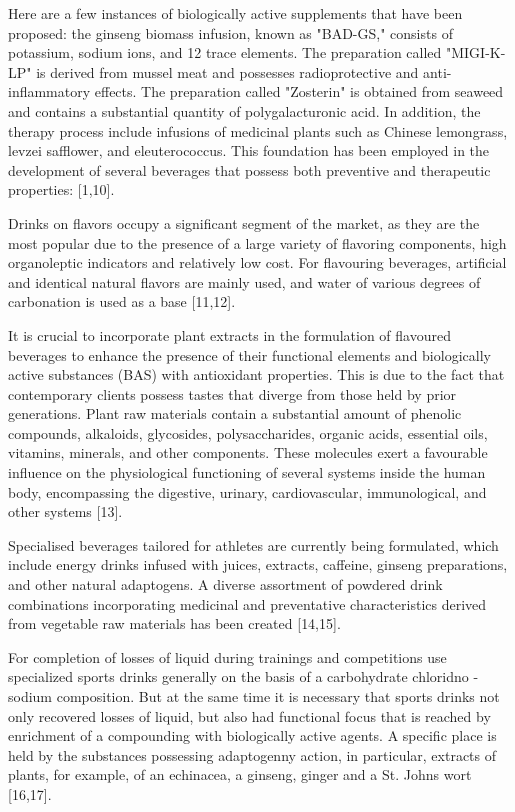 \begin{multicols}{2}
Here are a few instances of biologically active supplements that have
been proposed: the ginseng biomass infusion, known as "BAD-GS," consists
of potassium, sodium ions, and 12 trace elements. The preparation called
"MIGI-K-LP" is derived from mussel meat and possesses radioprotective
and anti-inflammatory effects. The preparation called "Zosterin" is
obtained from seaweed and contains a substantial quantity of
polygalacturonic acid. In addition, the therapy process include
infusions of medicinal plants such as Chinese lemongrass, levzei
safflower, and eleuterococcus. This foundation has been employed in the
development of several beverages that possess both preventive and
therapeutic properties: {[}1,10{]}.

Drinks on flavors occupy a significant segment of the market, as they
are the most popular due to the presence of a large variety of flavoring
components, high organoleptic indicators and relatively low cost. For
flavouring beverages, artificial and identical natural flavors are
mainly used, and water of various degrees of carbonation is used as a
base {[}11,12{]}.

It is crucial to incorporate plant extracts in the formulation of
flavoured beverages to enhance the presence of their functional elements
and biologically active substances (BAS) with antioxidant properties.
This is due to the fact that contemporary clients possess tastes that
diverge from those held by prior generations. Plant raw materials
contain a substantial amount of phenolic compounds, alkaloids,
glycosides, polysaccharides, organic acids, essential oils, vitamins,
minerals, and other components. These molecules exert a favourable
influence on the physiological functioning of several systems inside the
human body, encompassing the digestive, urinary, cardiovascular,
immunological, and other systems {[}13{]}.~

Specialised beverages tailored for athletes are currently being
formulated, which include energy drinks infused with juices, extracts,
caffeine, ginseng preparations, and other natural adaptogens. A diverse
assortment of powdered drink combinations incorporating medicinal and
preventative characteristics derived from vegetable raw materials has
been created {[}14,15{]}.

For completion of losses of liquid during trainings and competitions use
specialized sports drinks generally on the basis of a carbohydrate
chloridno - sodium composition. But at the same time it is necessary
that sports drinks not only recovered losses of liquid, but also had
functional focus that is reached by enrichment of a compounding with
biologically active agents. A specific place is held by the substances
possessing adaptogenny action, in particular, extracts of plants, for
example, of an echinacea, a ginseng, ginger and a St.
John\textquotesingle s wort {[}16,17{]}.


\end{multicols}
